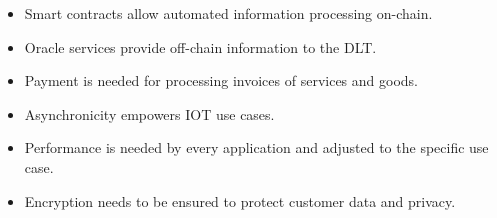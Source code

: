 \documentclass[conference]{IEEEtran}
\begin{document}
\begin{itemize}
  \item Smart contracts allow automated information processing on-chain.
  \item Oracle services provide off-chain information to the DLT.
  \item Payment is needed for processing invoices of services and goods.
  \item Asynchronicity empowers IOT use cases.
  \item Performance is needed by every application and adjusted to the specific use case.
  \item Encryption needs to be ensured to protect customer data and privacy.
\end{itemize}



\end{document}
